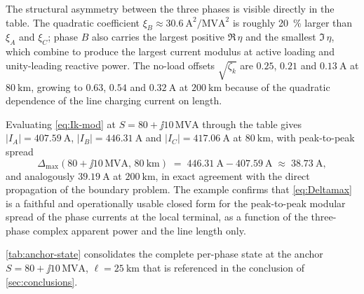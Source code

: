 The structural asymmetry between the three phases is visible directly
in the table. The quadratic coefficient $\xi_{B}\approx
\SI{30.6}{\ampere\squared/\mega\volt\ampere\squared}$ is roughly
\SI{20}{\percent} larger than $\xi_{A}$ and $\xi_{C}$; phase $B$ also
carries the largest positive $\Re\,\eta$ and the smallest $\Im\,\eta$,
which combine to produce the largest current modulus at active loading
and unity-leading reactive power. The no-load offsets
$\sqrt{\zeta_{k}}$ are $0.25$, $0.21$ and $\SI{0.13}{\ampere}$ at
$\SI{80}{\kilo\metre}$, growing to $0.63$, $0.54$ and
$\SI{0.32}{\ampere}$ at $\SI{200}{\kilo\metre}$ because of the
quadratic dependence of the line charging current on length.

Evaluating \autoref{eq:Ik-mod} at $S=80+\jj 10\,\si{\mega\volt\ampere}$
through the table gives $|I_{A}|=\SI{407.59}{\ampere}$,
$|I_{B}|=\SI{446.31}{\ampere}$ and $|I_{C}|=\SI{417.06}{\ampere}$ at
$\SI{80}{\kilo\metre}$, with peak-to-peak spread
\begin{equation}
\Delta_{\max}(80+\jj 10\,\si{\mega\volt\ampere},\,\SI{80}{\kilo\metre})
\;=\;
\SI{446.31}{\ampere} - \SI{407.59}{\ampere}
\;\approx\;
\SI{38.73}{\ampere},
\end{equation}
and analogously $\SI{39.19}{\ampere}$ at $\SI{200}{\kilo\metre}$, in
exact agreement with the direct propagation of the boundary problem.
The example confirms that \autoref{eq:Deltamax} is a faithful and
operationally usable closed form for the peak-to-peak modular spread
of the phase currents at the local terminal, as a function of the
three-phase complex apparent power and the line length only.

\autoref{tab:anchor-state} consolidates the complete per-phase state
at the anchor $S=80+\jj 10\,\si{\mega\volt\ampere}$,
$\ell=\SI{25}{\kilo\metre}$ that is referenced in the conclusion of
\autoref{sec:conclusions}.

